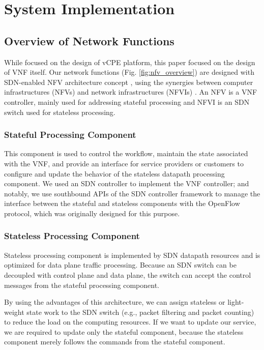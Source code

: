 \chapter{System Implementation} \label{ch:implementation}
\section{Overview of Network Functions} \label{sec:desc_nfv_overview}

While \cite{che-wei-master} focused on the design of vCPE platform, this paper focused on the design of VNF itself. Our network functions (Fig. \ref{fig:nfv_overview}) are designed with SDN-enabled NFV architecture concept \cite{sdn-enabled}, using the synergies between computer infrastructures (NFVs) and network infrastructures (NFVIs) \cite{etsi-nfv-terminology, etsi-nfv-infra}. An NFV is a VNF controller, mainly used for addressing stateful processing and NFVI is an SDN switch used for stateless processing.


\subsection{Stateful Processing Component}
This component is used to control the workflow, maintain the state associated with the VNF, and provide an interface for service providers or customers to configure and update the behavior of the stateless datapath processing component. We used an SDN controller to implement the VNF controller; and notably, we use southbound APIs of the SDN controller framework to manage the interface between the stateful and stateless components with the OpenFlow protocol, which was originally designed for this purpose.


\subsection{Stateless Processing Component}
Stateless processing component is implemented by SDN datapath resources and is optimized for data plane traffic processing. Because an SDN switch can be decoupled with control plane and data plane, the switch can accept the control messages from the stateful processing component.

By using the advantages of this architecture, we can assign stateless or light-weight state work to the SDN switch (e.g., packet filtering and packet counting) to reduce the load on the computing resources. If we want to update our service, we are required to update only the stateful component, because the stateless component merely follows the commands from the stateful component.

